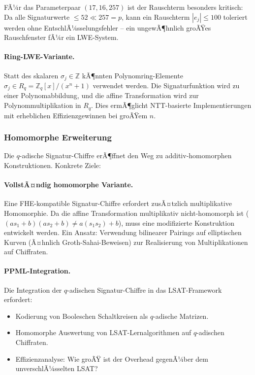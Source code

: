 ﻿\documentclass[a4paper,12pt]{scrreprt}
\theoremstyle{definition}
\begin{document}
FÃ¼r das Parameterpaar $(17, 16, 257)$ ist der Rauschterm besonders kritisch: Da alle Signaturwerte $\leq 52 \ll 257 = p$, kann ein Rauschterm $|e_j| \leq 100$ toleriert werden ohne EntschlÃ¼sselungsfehler -- ein ungewÃ¶hnlich groÃŸes Rauschfenster fÃ¼r ein LWE-System.

\paragraph{Ring-LWE-Variante.}
Statt des skalaren $\sigma_j \in \mathbb{Z}$ kÃ¶nnten Polynomring-Elemente $\hat{\sigma}_j \in R_q = \mathbb{Z}_q[x]/(x^n+1)$ verwendet werden. Die Signaturfunktion wird zu einer Polynomabbildung, und die affine Transformation wird zur Polynommultiplikation in $R_q$. Dies ermÃ¶glicht NTT-basierte Implementierungen mit erheblichen Effizienzgewinnen bei groÃŸem $n$.

\subsubsection{Homomorphe Erweiterung}

Die $q$-adische Signatur-Chiffre erÃ¶ffnet den Weg zu additiv-homomorphen Konstruktionen. Konkrete Ziele:

\paragraph{VollstÃ¤ndig homomorphe Variante.}
Eine FHE-kompatible Signatur-Chiffre erfordert zusÃ¤tzlich multiplikative Homomorphie. Da die affine Transformation multiplikativ nicht-homomorph ist ($(as_1+b)(as_2+b) \neq a(s_1 s_2)+b$), muss eine modifizierte Konstruktion entwickelt werden. Ein Ansatz: Verwendung bilinearer Pairings auf elliptischen Kurven (Ã¤hnlich Groth-Sahai-Beweisen) zur Realisierung von Multiplikationen auf Chiffraten.

\paragraph{PPML-Integration.}
Die Integration der $q$-adischen Signatur-Chiffre in das LSAT-Framework \cite{Epp26d} erfordert:
\begin{itemize}
    \item Kodierung von Booleschen Schaltkreisen als $q$-adische Matrizen.
    \item Homomorphe Auswertung von LSAT-Lernalgorithmen auf $q$-adischen Chiffraten.
    \item Effizienzanalyse: Wie groÃŸ ist der Overhead gegenÃ¼ber dem unverschlÃ¼sselten LSAT?
\end{itemize}
\end{document}
